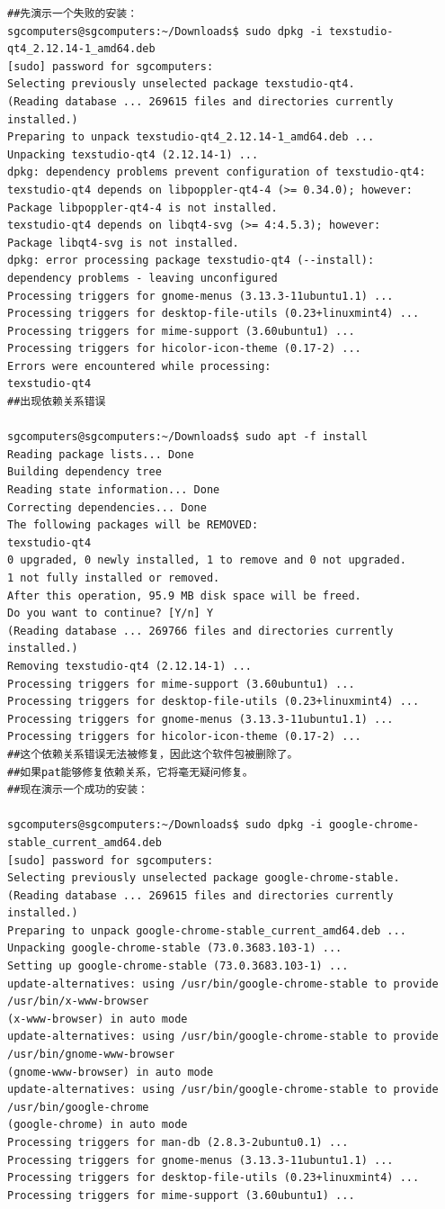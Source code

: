 \begin{verbatim}
##先演示一个失败的安装：
sgcomputers@sgcomputers:~/Downloads$ sudo dpkg -i texstudio-qt4_2.12.14-1_amd64.deb
[sudo] password for sgcomputers: 
Selecting previously unselected package texstudio-qt4.
(Reading database ... 269615 files and directories currently installed.)
Preparing to unpack texstudio-qt4_2.12.14-1_amd64.deb ...
Unpacking texstudio-qt4 (2.12.14-1) ...
dpkg: dependency problems prevent configuration of texstudio-qt4:
texstudio-qt4 depends on libpoppler-qt4-4 (>= 0.34.0); however:
Package libpoppler-qt4-4 is not installed.
texstudio-qt4 depends on libqt4-svg (>= 4:4.5.3); however:
Package libqt4-svg is not installed.
dpkg: error processing package texstudio-qt4 (--install):
dependency problems - leaving unconfigured
Processing triggers for gnome-menus (3.13.3-11ubuntu1.1) ...
Processing triggers for desktop-file-utils (0.23+linuxmint4) ...
Processing triggers for mime-support (3.60ubuntu1) ...
Processing triggers for hicolor-icon-theme (0.17-2) ...
Errors were encountered while processing:
texstudio-qt4
##出现依赖关系错误

sgcomputers@sgcomputers:~/Downloads$ sudo apt -f install
Reading package lists... Done
Building dependency tree       
Reading state information... Done
Correcting dependencies... Done
The following packages will be REMOVED:
texstudio-qt4
0 upgraded, 0 newly installed, 1 to remove and 0 not upgraded.
1 not fully installed or removed.
After this operation, 95.9 MB disk space will be freed.
Do you want to continue? [Y/n] Y
(Reading database ... 269766 files and directories currently installed.)
Removing texstudio-qt4 (2.12.14-1) ...
Processing triggers for mime-support (3.60ubuntu1) ...
Processing triggers for desktop-file-utils (0.23+linuxmint4) ...
Processing triggers for gnome-menus (3.13.3-11ubuntu1.1) ...
Processing triggers for hicolor-icon-theme (0.17-2) ...
##这个依赖关系错误无法被修复，因此这个软件包被删除了。
##如果pat能够修复依赖关系，它将毫无疑问修复。
##现在演示一个成功的安装：

sgcomputers@sgcomputers:~/Downloads$ sudo dpkg -i google-chrome-stable_current_amd64.deb
[sudo] password for sgcomputers: 
Selecting previously unselected package google-chrome-stable.
(Reading database ... 269615 files and directories currently installed.)
Preparing to unpack google-chrome-stable_current_amd64.deb ...
Unpacking google-chrome-stable (73.0.3683.103-1) ...
Setting up google-chrome-stable (73.0.3683.103-1) ...
update-alternatives: using /usr/bin/google-chrome-stable to provide /usr/bin/x-www-browser 
(x-www-browser) in auto mode
update-alternatives: using /usr/bin/google-chrome-stable to provide /usr/bin/gnome-www-browser
(gnome-www-browser) in auto mode
update-alternatives: using /usr/bin/google-chrome-stable to provide /usr/bin/google-chrome
(google-chrome) in auto mode
Processing triggers for man-db (2.8.3-2ubuntu0.1) ...
Processing triggers for gnome-menus (3.13.3-11ubuntu1.1) ...
Processing triggers for desktop-file-utils (0.23+linuxmint4) ...
Processing triggers for mime-support (3.60ubuntu1) ...

\end{verbatim} \par

